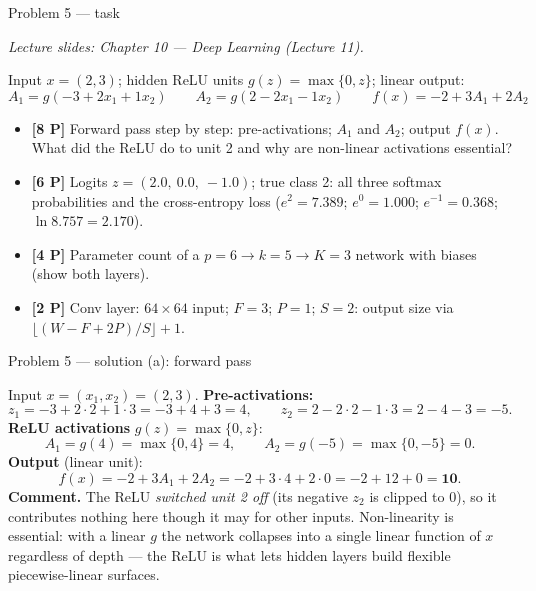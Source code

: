 \documentclass[aspectratio=169,11pt]{beamer}
\begin{document}
\begin{frame}{Problem 5 --- task}
  \begin{exercise}
    {\scriptsize\itshape Lecture slides: Chapter 10 --- Deep Learning (Lecture 11).}\par\smallskip
    Input $x=(2{,}3)$; hidden ReLU units $g(z)=\max\{0{,}z\}$; linear output:
    \[
      A_1=g(-3+2x_1+1x_2)\qquad A_2=g(2-2x_1-1x_2)\qquad f(x)=-2+3A_1+2A_2
    \]
    \begin{itemize}
      \item[(a)] \textbf{[8 P]} Forward pass step by step: pre-activations; $A_1$ and $A_2$;
        output $f(x)$. What did the ReLU do to unit 2 and why are non-linear activations essential?
      \item[(b)] \textbf{[6 P]} Logits $z=(2.0{,}\ 0.0{,}\ -1.0)$; true class 2: all three softmax
        probabilities and the cross-entropy loss
        ($e^{2}=7.389$; $e^{0}=1.000$; $e^{-1}=0.368$; $\ln 8.757=2.170$).
      \item[(c)] \textbf{[4 P]} Parameter count of a $p=6\to k=5\to K=3$ network with biases
        (show both layers).
      \item[(d)] \textbf{[2 P]} Conv layer: $64\times 64$ input; $F=3$; $P=1$; $S=2$:
        output size via $\lfloor(W-F+2P)/S\rfloor+1$.
    \end{itemize}
  \end{exercise}
\end{frame}

\begin{frame}{Problem 5 --- solution (a): forward pass}
  \begin{solutionbox}
    Input $x=(x_1,x_2)=(2,3)$. \textbf{Pre-activations:}
    \[
      z_1=-3+2\cdot2+1\cdot3=-3+4+3=4,\qquad
      z_2=2-2\cdot2-1\cdot3=2-4-3=-5.
    \]
    \textbf{ReLU activations} $g(z)=\max\{0,z\}$:
    \[
      A_1=g(4)=\max\{0,4\}=4,\qquad A_2=g(-5)=\max\{0,-5\}=0.
    \]
    \textbf{Output} (linear unit):
    \[
      f(x)=-2+3A_1+2A_2=-2+3\cdot4+2\cdot0=-2+12+0=\mathbf{10}.
    \]
    \textbf{Comment.} The ReLU \emph{switched unit 2 off} (its negative $z_2$ is clipped to $0$),
    so it contributes nothing here though it may for other inputs. Non-linearity is essential:
    with a linear $g$ the network collapses into a single linear function of $x$ regardless of
    depth --- the ReLU is what lets hidden layers build flexible piecewise-linear surfaces.
  \end{solutionbox}
\end{frame}
\end{document}
